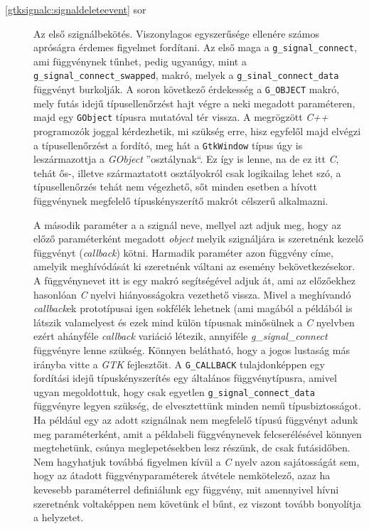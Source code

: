 \begin{description}
 \item[\ref{gtksignalc:signaldeleteevent} sor] Az első szignálbekötés. Viszonylagos egyszerűsége ellenére számos apróságra érdemes figyelmet fordítani. Az első maga a \texttt{g\_signal\_connect}, ami függvénynek tűnhet, pedig ugyanúgy, mint a \texttt{g\_signal\_connect\_swapped}, makró, melyek a \texttt{g\_sinal\_connect\_data} függvényt burkolják. A soron következő érdekesség a \texttt{G\_OBJECT} makró, mely futás idejű típusellenőrzést hajt végre a neki megadott paraméteren, majd egy \texttt{GObject} típusra mutatóval tér vissza. A megrögzött \textit{C++} programozók joggal kérdezhetik, mi szükség erre, hisz egyfelől majd elvégzi a típusellenőrzést a fordító, meg hát a \texttt{GtkWindow} típus úgy is leszármazottja a \textit{GObject} ''osztálynak``. Ez így is lenne, na de ez itt \textit{C}, tehát ős-, illetve származtatott osztályokról csak logikailag lehet szó, a típusellenőrzés tehát nem végezhető, sőt minden esetben a hívott függvénynek megfelelő típuskényszerítő makrót célszerű alkalmazni.

A második paraméter a a szignál neve, mellyel azt adjuk meg, hogy az előző paraméterként megadott \textit{object} melyik szignáljára is szeretnénk kezelő függvényt (\textit{callback}) kötni. Harmadik paraméter azon függvény címe, amelyik meghívódását ki szeretnénk váltani az esemény bekövetkezésekor. A függvénynevet itt is egy makró segítségével adjuk át, ami az előzőekhez hasonlóan \textit{C} nyelvi hiányosságokra vezethető vissza. Mivel a meghívandó \textit{callback}ek prototípusai igen sokfélék lehetnek (ami magából a példából is látszik valamelyest és ezek mind külön típusnak minősülnek a \textit{C} nyelvben ezért ahányféle \textit{callback} variáció létezik, annyiféle \textit{g\_signal\_connect} függvényre lenne szükség. Könnyen belátható, hogy a jogos lustaság más irányba vitte a \textit{GTK} fejlesztőit. A \texttt{G\_CALLBACK} tulajdonképpen egy fordítási idejű típuskényszerítés egy általános függvénytípusra, amivel ugyan megoldottuk, hogy csak egyetlen \texttt{g\_signal\_connect\_data} függvényre legyen szükség, de elvesztettünk minden nemű típusbiztosságot. Ha például egy az adott szignálnak nem megfelelő típusú függvényt adunk meg paraméterként, amit a példabeli függvénynevek felcserélésével könnyen megtehetünk, csúnya meglepetésekben lesz részünk, de csak futásidőben. Nem hagyhatjuk továbbá figyelmen kívül a \textit{C} nyelv azon sajátosságát sem, hogy az átadott függvényparaméterek átvétele nemkötelező, azaz ha kevesebb paraméterrel definiálunk egy függvény, mit amennyivel hívni szeretnénk voltaképpen nem követünk el bűnt, ez viszont tovább bonyolítja a helyzetet.


\end{description}
